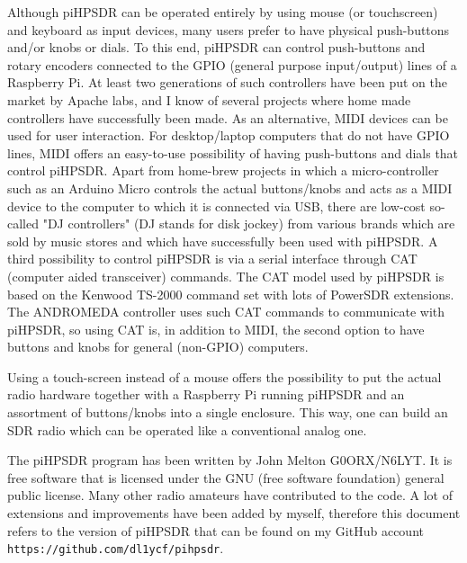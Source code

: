 \documentclass[12pt]{book}
\def\pH{pi\-HPSDR\xspace}
\begin{document}
Although \pH can be operated entirely by using mouse (or touchscreen)
and keyboard as input devices, many users prefer to
have physical push-buttons and/or knobs or dials. To this end, \pH can control push-buttons and rotary
encoders connected to the GPIO (general purpose input/output)
lines of a Raspberry Pi. At least two generations of such controllers have
been put on the market by Apache labs, and I know of several projects where home made controllers have
successfully been made. As an alternative, MIDI devices can be used for user interaction. For desktop/laptop
computers that do not have GPIO lines, MIDI offers an easy-to-use possibility of having push-buttons and
dials that control \pH. Apart from home-brew projects in which a micro-controller such as an Arduino
Micro controls the actual buttons/knobs and acts as a MIDI device to the computer to which it is connected
via USB, there are low-cost so-called "DJ controllers" (DJ stands for disk jockey) from various brands
which are sold by music stores and
which
have successfully been used with \pH. A third possibility to control \pH is via a serial interface
through CAT (computer aided transceiver) commands. The CAT model used by \pH is based on the Kenwood
TS-2000 command set with lots of PowerSDR extensions. The ANDROMEDA controller uses such CAT commands to
communicate with \pH, so using CAT is, in addition to MIDI, the second option to have buttons and knobs
for general (non-GPIO) computers.

Using a touch-screen instead of a mouse offers the possibility to put the actual radio hardware together
with a Raspberry Pi running \pH and an assortment of buttons/knobs into a single enclosure. This way,
one can build an SDR radio which can be operated like a conventional analog one.

The \pH program has been written by John Melton G0ORX/N6LYT. It is free software that is licensed under
the GNU (free software foundation) general public license. Many other radio amateurs have contributed to
the code. A lot of extensions and improvements have been added by myself, therefore this document refers
to the version of \pH that can be found on my GitHub account \texttt{https://github.com/dl1ycf/pihpsdr}.
\end{document}
